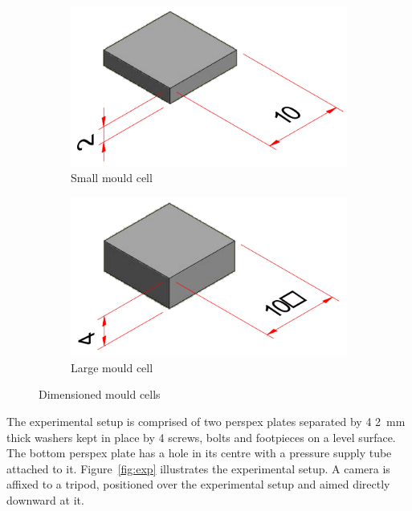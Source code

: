 \begin{figure}[H]
	\centering
	\begin{subfigure}[c]{0.3\textwidth}
		\centering
		\includegraphics[width=\textwidth]{MCS.png}
		\caption{Small mould cell}
	\end{subfigure}
	\hfill
	\begin{subfigure}[c]{0.3\textwidth}
		\centering
		\includegraphics[width=\textwidth]{MCL.png}
		\caption{Large mould cell}
	\end{subfigure}
	\caption{Dimensioned mould cells}
	\label{fig:mc}
\end{figure}

The experimental setup is comprised of two perspex plates separated by 4 \SI{2}{mm} thick washers kept in place by 4 screws, bolts and footpieces on a level surface. The bottom perspex plate has a hole in its centre with a pressure supply tube attached to it. Figure~\ref{fig:exp} illustrates the experimental setup. A camera is affixed to a tripod, positioned over the experimental setup and aimed directly downward at it.

